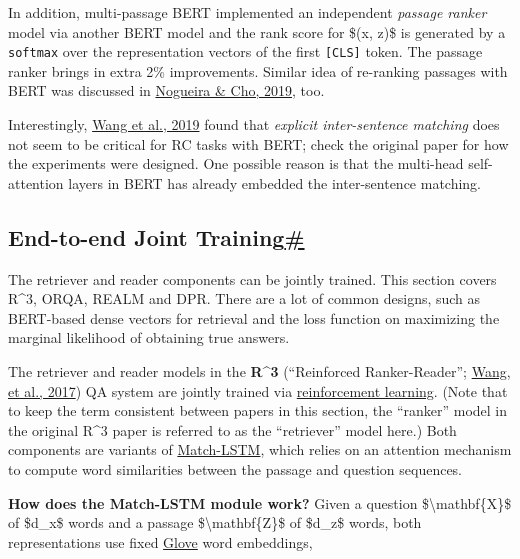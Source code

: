 In addition, multi-passage BERT implemented an independent \emph{passage ranker} model via another BERT model and the rank score for \$(x, z)\$ is generated by a \texttt{softmax} over the representation vectors of the first \texttt{{[}CLS{]}} token. The passage ranker brings in extra 2\% improvements. Similar idea of re-ranking passages with BERT was discussed in \href{https://arxiv.org/abs/1901.04085}{Nogueira \& Cho, 2019}, too.

Interestingly, \href{https://arxiv.org/abs/1908.08167}{Wang et al., 2019} found that \emph{explicit inter-sentence matching} does not seem to be critical for RC tasks with BERT; check the original paper for how the experiments were designed. One possible reason is that the multi-head self-attention layers in BERT has already embedded the inter-sentence matching.

\subsection{\texorpdfstring{End-to-end Joint Training\hyperref[end-to-end-joint-training]{\#}}{End-to-end Joint Training\#}}\label{end-to-end-joint-training}

The retriever and reader components can be jointly trained. This section covers R\^{}3, ORQA, REALM and DPR. There are a lot of common designs, such as BERT-based dense vectors for retrieval and the loss function on maximizing the marginal likelihood of obtaining true answers.

The retriever and reader models in the \textbf{R\^{}3} (``Reinforced Ranker-Reader''; \href{https://arxiv.org/abs/1709.00023}{Wang, et al., 2017}) QA system are jointly trained via \href{https://lilianweng.github.io/posts/2018-02-19-rl-overview/}{reinforcement learning}. (Note that to keep the term consistent between papers in this section, the ``ranker'' model in the original R\^{}3 paper is referred to as the ``retriever'' model here.) Both components are variants of \href{https://arxiv.org/abs/1512.08849}{Match-LSTM}, which relies on an attention mechanism to compute word similarities between the passage and question sequences.

\textbf{How does the Match-LSTM module work?} Given a question \$\textbackslash mathbf\{X\}\$ of \$d\_x\$ words and a passage \$\textbackslash mathbf\{Z\}\$ of \$d\_z\$ words, both representations use fixed \href{https://lilianweng.github.io/posts/2017-10-15-word-embedding/\#glove-global-vectors}{Glove} word embeddings,

